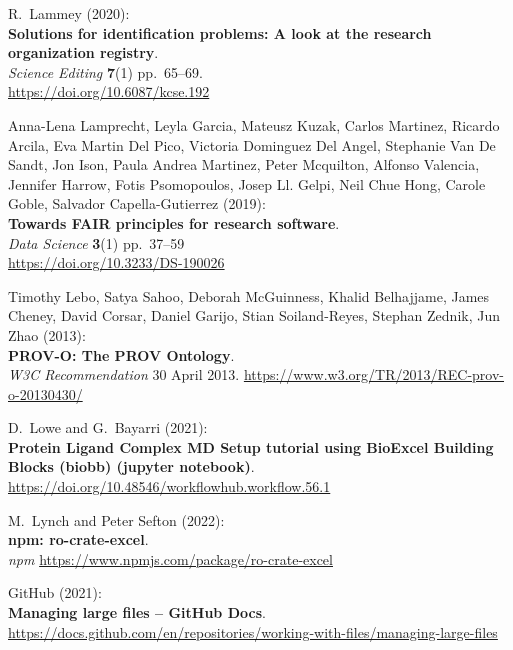 \begin{thebibliography}{9}
R.~Lammey (2020):\\
\textbf{Solutions for identification problems: A look at the research
organization registry}.\\
\emph{Science Editing} \textbf{7}(1) pp.~65--69.\\
\url{https://doi.org/10.6087/kcse.192}

Anna-Lena Lamprecht, Leyla Garcia, Mateusz Kuzak, Carlos
Martinez, Ricardo Arcila, Eva Martin Del Pico, Victoria Dominguez Del
Angel, Stephanie Van De Sandt, Jon Ison, Paula Andrea Martinez, Peter
Mcquilton, Alfonso Valencia, Jennifer Harrow, Fotis Psomopoulos, Josep
Ll. Gelpi, Neil Chue Hong, Carole Goble, Salvador Capella-Gutierrez
(2019):\\
\textbf{Towards FAIR principles for research software}.\\
\emph{Data Science} \textbf{3}(1) pp.~37--59\\
\url{https://doi.org/10.3233/DS-190026}

Timothy Lebo, Satya Sahoo, Deborah McGuinness, Khalid Belhajjame, 
James Cheney, David Corsar, Daniel Garijo, Stian Soiland-Reyes, 
Stephan Zednik, Jun Zhao (2013):\\
\textbf{PROV-O: The PROV Ontology}.\\
\emph{W3C Recommendation} 30 April 2013.
\url{https://www.w3.org/TR/2013/REC-prov-o-20130430/}

D.~Lowe and G.~Bayarri (2021):\\
\textbf{Protein Ligand Complex MD Setup tutorial using BioExcel Building
Blocks (biobb) (jupyter notebook)}.\\
\url{https://doi.org/10.48546/workflowhub.workflow.56.1}

M.~Lynch and Peter Sefton (2022):\\
\textbf{npm: ro-crate-excel}.\\
\emph{npm} \url{https://www.npmjs.com/package/ro-crate-excel}

GitHub (2021):\\
\textbf{Managing large files -- GitHub Docs}.\\
\url{https://docs.github.com/en/repositories/working-with-files/managing-large-files}


\end{thebibliography}
